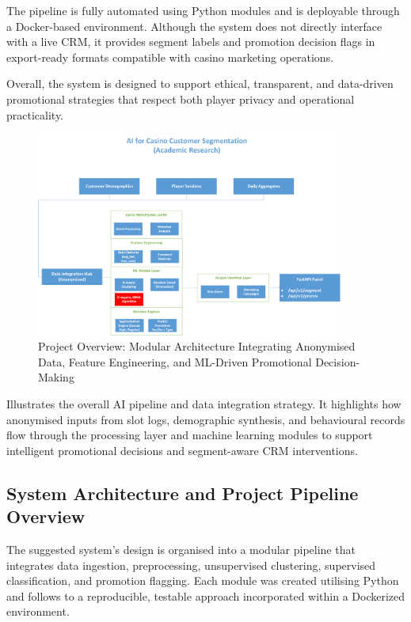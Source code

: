\documentclass[12pt,a4paper]{report}
\begin{document}
The pipeline is fully automated using Python modules and is deployable through a Docker-based environment. Although the system does not directly interface with a live CRM, it provides segment labels and promotion decision flags in export-ready formats compatible with casino marketing operations.

Overall, the system is designed to support ethical, transparent, and data-driven promotional strategies that respect both player privacy and operational practicality.

\begin{figure}[H]
\centering
\includegraphics[width=0.9\textwidth]{figures/project_overview_diagram.png}
\caption{Project Overview: Modular Architecture Integrating Anonymised Data, Feature Engineering, and ML-Driven Promotional Decision-Making}
\label{fig:overview and scope}
\end{figure}

Illustrates the overall AI pipeline and data integration strategy. It highlights how anonymised inputs from slot logs, demographic synthesis, and behavioural records flow through the processing layer and machine learning modules to support intelligent promotional decisions and segment-aware CRM interventions.

\subsection{System Architecture and Project Pipeline Overview}
The suggested system's design is organised into a modular pipeline that integrates data ingestion, preprocessing, unsupervised clustering, supervised classification, and promotion flagging. Each module was created utilising Python and follows to a reproducible, testable approach incorporated within a Dockerized environment.
\end{document}
